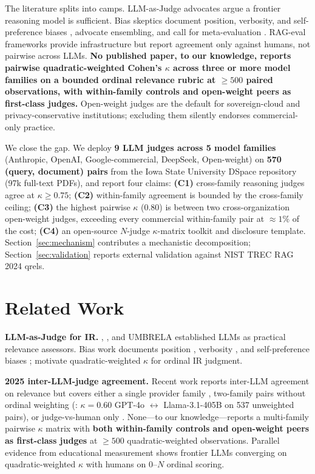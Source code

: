\documentclass[11pt,letterpaper]{article}
\begin{document}
The literature splits into camps. LLM-as-Judge advocates argue a frontier reasoning model is sufficient. Bias skeptics document position, verbosity, and self-preference biases \citep{wang2023fair,saito2023verbosity,panickssery2024self}, advocate ensembling, and call for meta-evaluation \citep{thakur2024judges}. RAG-eval frameworks \citep{es2024ragas} provide infrastructure but report agreement only against humans, not pairwise across LLMs. \textbf{No published paper, to our knowledge, reports pairwise quadratic-weighted Cohen's $\kappa$ across three or more model families on a bounded ordinal relevance rubric at $\geq 500$ paired observations, with within-family controls and open-weight peers as first-class judges.} Open-weight judges are the default for sovereign-cloud and privacy-conservative institutions; excluding them silently endorses commercial-only practice.

We close the gap. We deploy \textbf{9 LLM judges across 5 model families} (Anthropic, OpenAI, Google-commercial, DeepSeek, Open-weight) on \textbf{570 (query, document) pairs} from the Iowa State University DSpace repository (97k full-text PDFs), and report four claims: \textbf{(C1)} cross-family reasoning judges agree at $\kappa \geq 0.75$; \textbf{(C2)} within-family agreement is bounded by the cross-family ceiling; \textbf{(C3)} the highest pairwise $\kappa$ (0.80) is between two cross-organization open-weight judges, exceeding every commercial within-family pair at $\approx 1\%$ of the cost; \textbf{(C4)} an open-source $N$-judge $\kappa$-matrix toolkit and disclosure template. Section~\ref{sec:mechanism} contributes a mechanistic decomposition; Section~\ref{sec:validation} reports external validation against NIST TREC RAG 2024 qrels.

\section{Related Work}\label{sec:related}

\textbf{LLM-as-Judge for IR.} \citet{faggioli2023perspectives}, \citet{rahmani2024judges}, and UMBRELA \citep{upadhyay2024umbrela} established LLMs as practical relevance assessors. Bias work documents position \citep{wang2023fair}, verbosity \citep{saito2023verbosity,chen2024humans}, and self-preference biases \citep{panickssery2024self}; \citet{thakur2024judges} motivate quadratic-weighted $\kappa$ for ordinal IR judgment.

\textbf{2025 inter-LLM-judge agreement.} Recent work reports inter-LLM agreement on relevance but covers either a single provider family \citep{balog2025rankersjudges,farzi2025umbrela_other}, two-family pairs without ordinal weighting (\citealp{thakur2025trecragsupport}: $\kappa = 0.60$ GPT-4o $\leftrightarrow$ Llama-3.1-405B on 537 unweighted pairs), or judge-vs-human only \citep{han2025judgesverdict}. None---to our knowledge---reports a multi-family pairwise $\kappa$ matrix with \textbf{both within-family controls and open-weight peers as first-class judges} at $\geq 500$ quadratic-weighted observations. Parallel evidence from educational measurement \citep{jiao2026essayraters} shows frontier LLMs converging on quadratic-weighted $\kappa$ with humans on 0--$N$ ordinal scoring.
\end{document}
